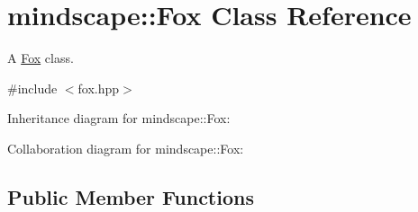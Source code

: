 \hypertarget{classmindscape_1_1_fox}{}\section{mindscape\+:\+:Fox Class Reference}
\label{classmindscape_1_1_fox}


A \hyperlink{classmindscape_1_1_fox}{Fox} class.  




{\ttfamily \#include $<$fox.\+hpp$>$}



Inheritance diagram for mindscape\+:\+:Fox\+:


Collaboration diagram for mindscape\+:\+:Fox\+:
\subsection*{Public Member Functions}
